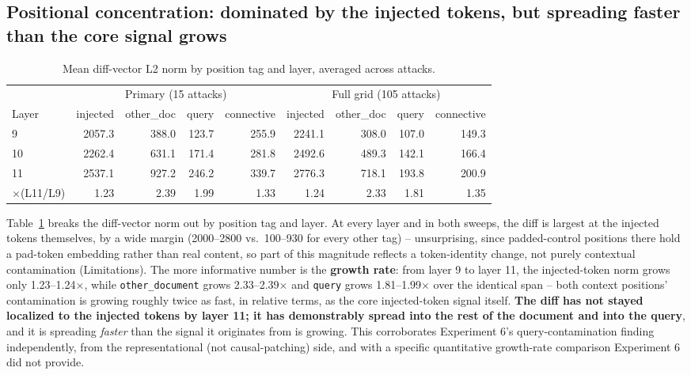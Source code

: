 \documentclass[11pt]{article}
\begin{document}
\subsection{Positional concentration: dominated by the injected tokens, but spreading faster than the core signal grows}
\label{sec:results-position}

\begin{table}[H]
\centering
\caption{Mean diff-vector L2 norm by position tag and layer, averaged across attacks.}
\label{tab:posconc}
\begin{tabular}{lrrrr|rrrr}
\toprule
& \multicolumn{4}{c}{Primary (15 attacks)} & \multicolumn{4}{c}{Full grid (105 attacks)} \\
Layer & injected & other\_doc & query & connective & injected & other\_doc & query & connective \\
\midrule
9  & 2057.3 & 388.0 & 123.7 & 255.9 & 2241.1 & 308.0 & 107.0 & 149.3 \\
10 & 2262.4 & 631.1 & 171.4 & 281.8 & 2492.6 & 489.3 & 142.1 & 166.4 \\
11 & 2537.1 & 927.2 & 246.2 & 339.7 & 2776.3 & 718.1 & 193.8 & 200.9 \\
\midrule
$\times$(L11/L9) & 1.23 & 2.39 & 1.99 & 1.33 & 1.24 & 2.33 & 1.81 & 1.35 \\
\bottomrule
\end{tabular}
\end{table}

Table~\ref{tab:posconc} breaks the diff-vector norm out by position tag
and layer. At every layer and in both sweeps, the diff is largest at the
injected tokens themselves, by a wide margin (2000--2800 vs.\ 100--930 for every
other tag) -- unsurprising, since padded-control positions there hold a
pad-token embedding rather than real content, so part of this magnitude
reflects a token-identity change, not purely contextual contamination
(Limitations). The more informative number is the \textbf{growth rate}:
from layer 9 to layer 11, the injected-token norm grows only
1.23--1.24$\times$, while \texttt{other\_document} grows
2.33--2.39$\times$ and \texttt{query} grows 1.81--1.99$\times$ over the
identical span -- both context positions' contamination is growing roughly
twice as fast, in relative terms, as the core injected-token signal
itself. \textbf{The diff has not stayed localized to the injected tokens
by layer 11; it has demonstrably spread into the rest of the document and
into the query}, and it is spreading \emph{faster} than the signal it
originates from is growing. This corroborates Experiment 6's
query-contamination finding independently, from the representational
(not causal-patching) side, and with a specific quantitative growth-rate
comparison Experiment 6 did not provide.
\end{document}
